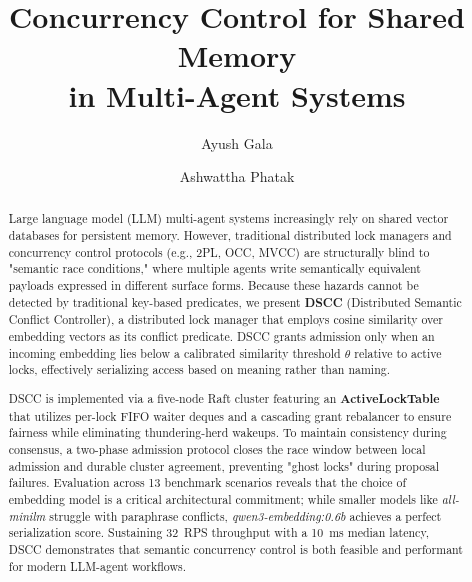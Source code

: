 \documentclass[sigconf]{acmart}
\begin{document}
\title{Concurrency Control for Shared Memory\\ in Multi-Agent Systems}

\author{Ayush Gala}

\author{Ashwattha Phatak}

\renewcommand{\shortauthors}{Gala and Phatak}

\begin{abstract}
Large language model (LLM) multi-agent systems increasingly rely on shared vector databases for persistent memory. However, traditional distributed lock managers and concurrency control protocols (e.g., 2PL, OCC, MVCC) are structurally blind to "semantic race conditions," where multiple agents write semantically equivalent payloads expressed in different surface forms. Because these hazards cannot be detected by traditional key-based predicates, we present \textbf{DSCC} (Distributed Semantic Conflict Controller), a distributed lock manager that employs cosine similarity over embedding vectors as its conflict predicate. DSCC grants admission only when an incoming embedding lies below a calibrated similarity threshold $\theta$ relative to active locks, effectively serializing access based on meaning rather than naming.

DSCC is implemented via a five-node Raft cluster featuring an \textbf{ActiveLockTable} that utilizes per-lock FIFO waiter deques and a cascading grant rebalancer to ensure fairness while eliminating thundering-herd wakeups. To maintain consistency during consensus, a two-phase admission protocol closes the race window between local admission and durable cluster agreement, preventing "ghost locks" during proposal failures. Evaluation across 13 benchmark scenarios reveals that the choice of embedding model is a critical architectural commitment; while smaller models like \textit{all-minilm} struggle with paraphrase conflicts, \textit{qwen3-embedding:0.6b} achieves a perfect serialization score. Sustaining 32~RPS throughput with a 10~ms median latency, DSCC demonstrates that semantic concurrency control is both feasible and performant for modern LLM-agent workflows.
\end{abstract}
\end{document}
